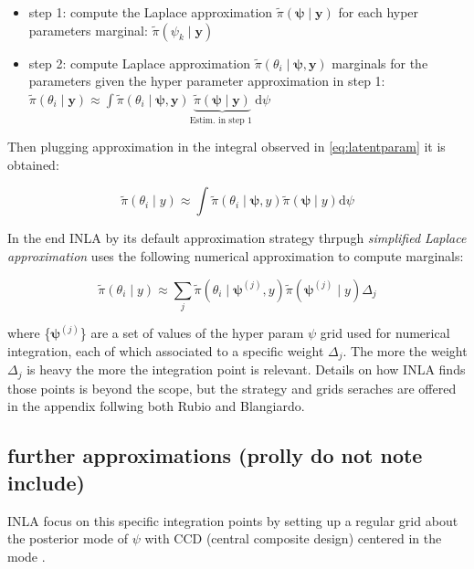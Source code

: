 \documentclass[
  12pt,
  a4paper,
  oneside]{book}
\providecommand{\tightlist}{%
  \setlength{\itemsep}{0pt}\setlength{\parskip}{0pt}}
\theoremstyle{definition}
\theoremstyle{definition}
\theoremstyle{definition}
\theoremstyle{remark}
\begin{document}
\begin{itemize}
\tightlist
\item
  step 1: compute the Laplace approximation \(\tilde\pi\left(\boldsymbol{\psi} \mid \boldsymbol{y}\right)\) for each hyper parameters marginal: \(\tilde\pi\left(\psi_{k} \mid \boldsymbol{y}\right)\)
\item
  step 2: compute Laplace approximation \(\tilde{\pi}\left(\theta_{i} \mid \boldsymbol{\psi}, \boldsymbol{y}\right)\) marginals for the parameters given the hyper parameter approximation in step 1: \(\tilde{\pi}\left(\theta_{i} \mid \boldsymbol{y}\right) \approx \int \tilde{\pi}\left(\theta_{i} \mid \boldsymbol{\psi}, \boldsymbol{y}\right) \underbrace{\tilde{\pi}(\boldsymbol{\psi} \mid \boldsymbol{y})}_{\text {Estim. in step 1 }} \mathrm{d} \psi\)
\end{itemize}

Then plugging approximation in the integral observed in \eqref{eq:latentparam} it is obtained:

\[
\tilde{\pi}\left(\theta_{i} \mid y\right) \approx \int \tilde{\pi}\left(\theta_{i} \mid  \boldsymbol{\psi}, y\right) \tilde{\pi}(\boldsymbol{\psi} \mid y) \mathrm{d} \psi
\]

In the end INLA by its default approximation strategy thrpugh \emph{simplified Laplace approximation} uses the following numerical approximation to compute marginals:

\[
\tilde{\pi}\left(\theta_{i} \mid y\right) \approx \sum_{j} \tilde{\pi}\left(\theta_{i} \mid \boldsymbol{\psi}^{(j)}, y\right) \tilde{\pi}\left(\boldsymbol{\psi}^{(j)} \mid y\right) \Delta_{j}
\]

where \{\(\boldsymbol{\psi}^{(j)}\)\} are a set of values of the hyper param \(\psi\) grid used for numerical integration, each of which associated to a specific weight \(\Delta_{j}\). The more the weight \(\Delta_{j}\) is heavy the more the integration point is relevant. Details on how INLA finds those points is beyond the scope, but the strategy and grids seraches are offered in the appendix follwing both Rubio and Blangiardo.

\hypertarget{further-approximations-prolly-do-not-note-include}{%
\subsection{further approximations (prolly do not note include)}\label{further-approximations-prolly-do-not-note-include}}

INLA focus on this specific integration points by setting up a regular grid about the posterior mode of \(\psi\) with CCD (central composite design) centered in the mode \citep{Bayesian_INLA_Rubio}.
\end{document}
